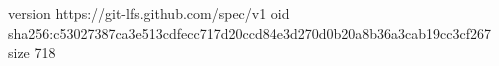 version https://git-lfs.github.com/spec/v1
oid sha256:c53027387ca3e513cdfecc717d20ccd84e3d270d0b20a8b36a3cab19cc3cf267
size 718
